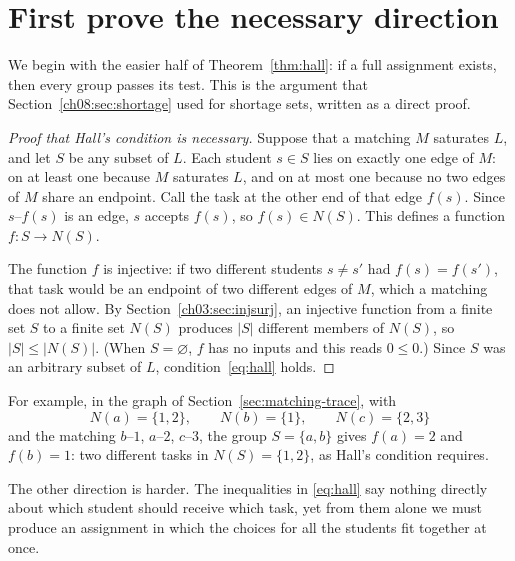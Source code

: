 \section{First prove the necessary direction}\label{ch09:sec:necessary}
We begin with the easier half of Theorem~\ref{thm:hall}: if a full assignment exists, then every group passes its test. This is the argument that Section~\ref{ch08:sec:shortage} used for shortage sets, written as a direct proof.

\begin{proof}[Proof that Hall's condition is necessary]
Suppose that a matching $M$ saturates $L$, and let $S$ be any subset of $L$. Each student $s\in S$ lies on exactly one edge of $M$: on at least one because $M$ saturates $L$, and on at most one because no two edges of $M$ share an endpoint. Call the task at the other end of that edge $f(s)$. Since $s$--$f(s)$ is an edge, $s$ accepts $f(s)$, so $f(s)\in N(S)$. This defines a function $f:S\to N(S)$.

The function $f$ is injective: if two different students $s\ne s'$ had $f(s)=f(s')$, that task would be an endpoint of two different edges of $M$, which a matching does not allow. By Section~\ref{ch03:sec:injsurj}, an injective function from a finite set $S$ to a finite set $N(S)$ produces $|S|$ different members of $N(S)$, so $|S|\le|N(S)|$. (When $S=\varnothing$, $f$ has no inputs and this reads $0\le0$.) Since $S$ was an arbitrary subset of $L$, condition~\eqref{eq:hall} holds.
\end{proof}

For example, in the graph of Section~\ref{sec:matching-trace}, with
\[
N(a)=\{1,2\},\qquad N(b)=\{1\},\qquad N(c)=\{2,3\}
\]
and the matching $b$--$1$, $a$--$2$, $c$--$3$, the group $S=\{a,b\}$ gives $f(a)=2$ and $f(b)=1$: two different tasks in $N(S)=\{1,2\}$, as Hall's condition requires.

The other direction is harder. The inequalities in \eqref{eq:hall} say nothing directly about which student should receive which task, yet from them alone we must produce an assignment in which the choices for all the students fit together at once.
